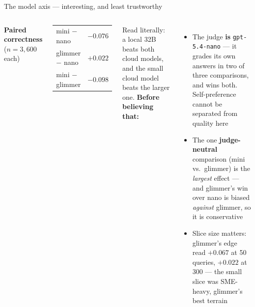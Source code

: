 \documentclass[aspectratio=169,10pt]{beamer}
\newcommand{\muted}[1]{\textcolor{inksec}{#1}}
\begin{document}
\begin{frame}{The model axis --- interesting, and least trustworthy}
  \begin{columns}[t]
    \textbf{Paired correctness} \muted{($n{=}3{,}600$ each)}
    \begin{center}
    \renewcommand{\arraystretch}{1.3}
    \begin{tabular}{@{}lr@{}}
      \toprule
      mini $-$ nano & $-0.076$ \\
      glimmer $-$ nano & $+0.022$ \\
      mini $-$ glimmer & $-0.098$ \\
      \bottomrule
    \end{tabular}
    \end{center}
    \medskip
    \muted{\small Read literally: a local 32B beats both cloud models, and the small cloud model
    beats the larger one.}
    \textbf{Before believing that:}
    \begin{itemize}
      \item The judge \textbf{is} \texttt{gpt-5.4-nano} --- it grades its own answers in two of
        three comparisons, and wins both. Self-preference cannot be separated from quality here
      \item The one \textbf{judge-neutral} comparison (mini vs.\ glimmer) is the \textit{largest}
        effect --- and glimmer's win over nano is biased \textit{against} glimmer, so it is conservative
      \item Slice size matters: glimmer's edge read $+0.067$ at 50 queries, $+0.022$ at 300 ---
        the small slice was SME-heavy, glimmer's best terrain
    \end{itemize}
  \end{columns}
\end{frame}
\end{document}
